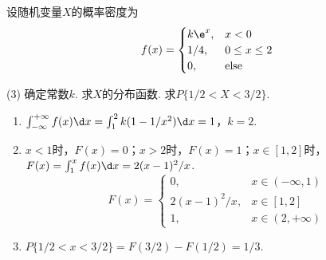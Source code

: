 \begin{problem}
    设随机变量$X$的概率密度为
    \[f(x)=\begin{cases}
        k\e^x, & x<0\\
        1/4, & 0\leq x\leq2\\
        0, & \text{else}
    \end{cases}\]
    \begin{tasks}[label=\arabic*.](3)
        \task 确定常数$k$.
        \task 求$X$的分布函数.
        \task 求$P\{1/2<X<3/2\}$.
    \end{tasks}
\end{problem}
\begin{solution}\leavevmode
    \begin{enumerate}
        \item $\int_{-\infty}^{+\infty}f(x)\d x=\int_1^2k(1-1/x^2)\d x=1$，$k=2$.
        \item $x<1$时，$F(x)=0$；$x>2$时，$F(x)=1$；$x\in[1,2]$时，$F(x)=\int_1^xf(x)\d x=2(x-1)^2/x$.
        \[F(x)=\begin{cases}
            0, & x\in (-\infty,1)\\
            2(x-1)^2/x, & x\in[1,2]\\
            1, & x\in(2,+\infty)
        \end{cases}\]
        \item $P\{1/2<x<3/2\}=F(3/2)-F(1/2)=1/3$.
    \end{enumerate}
\end{solution}

